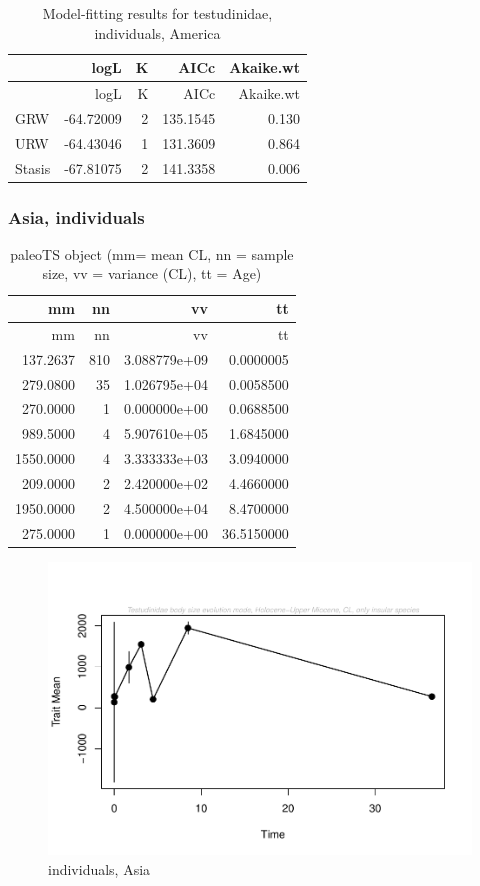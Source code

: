 \documentclass[]{article}
\begin{document}
\begin{longtable}[]{@{}lrrrr@{}}
\caption{Model-fitting results for testudinidae, individuals,
America}\tabularnewline
\toprule
& logL & K & AICc & Akaike.wt\tabularnewline
\midrule
\endfirsthead
\toprule
& logL & K & AICc & Akaike.wt\tabularnewline
\midrule
\endhead
GRW & -64.72009 & 2 & 135.1545 & 0.130\tabularnewline
URW & -64.43046 & 1 & 131.3609 & 0.864\tabularnewline
Stasis & -67.81075 & 2 & 141.3358 & 0.006\tabularnewline
\bottomrule
\end{longtable}

\newpage

\subsubsection{Asia, individuals}\label{asia-individuals}

\begin{longtable}[]{@{}rrrr@{}}
\caption{paleoTS object (mm= mean CL, nn = sample size, vv = variance
(CL), tt = Age)}\tabularnewline
\toprule
mm & nn & vv & tt\tabularnewline
\midrule
\endfirsthead
\toprule
mm & nn & vv & tt\tabularnewline
\midrule
\endhead
137.2637 & 810 & 3.088779e+09 & 0.0000005\tabularnewline
279.0800 & 35 & 1.026795e+04 & 0.0058500\tabularnewline
270.0000 & 1 & 0.000000e+00 & 0.0688500\tabularnewline
989.5000 & 4 & 5.907610e+05 & 1.6845000\tabularnewline
1550.0000 & 4 & 3.333333e+03 & 3.0940000\tabularnewline
209.0000 & 2 & 2.420000e+02 & 4.4660000\tabularnewline
1950.0000 & 2 & 4.500000e+04 & 8.4700000\tabularnewline
275.0000 & 1 & 0.000000e+00 & 36.5150000\tabularnewline
\bottomrule
\end{longtable}

\begin{figure}[htbp]
\centering
\includegraphics{MA_JJ_files/figure-latex/paleoTS, individuals, Asia-1.pdf}
\caption{individuals, Asia}
\end{figure}
\end{document}
